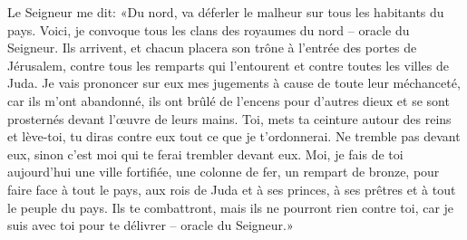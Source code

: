 Le Seigneur me dit:
	«Du nord, va déferler le malheur sur tous les habitants du pays.
Voici, je convoque tous les clans des royaumes du nord – oracle du Seigneur.
Ils arrivent, et chacun placera son trône à l’entrée des portes de Jérusalem,
	contre tous les remparts qui l’entourent
	et contre toutes les villes de Juda.
Je vais prononcer sur eux mes jugements à cause de toute leur méchanceté,
	car ils m’ont abandonné, ils ont brûlé de l’encens pour d’autres dieux
	et se sont prosternés devant l’œuvre de leurs mains.
Toi, mets ta ceinture autour des reins et lève-toi,
	tu diras contre eux tout ce que je t’ordonnerai.
Ne tremble pas devant eux, sinon c’est moi qui te ferai trembler devant eux.
Moi, je fais de toi aujourd’hui une ville fortifiée,
	une colonne de fer, un rempart de bronze,
	pour faire face à tout le pays,
	aux rois de Juda et à ses princes,
	à ses prêtres et à tout le peuple du pays.
Ils te combattront, mais ils ne pourront rien contre toi,
	car je suis avec toi pour te délivrer – oracle du Seigneur.»